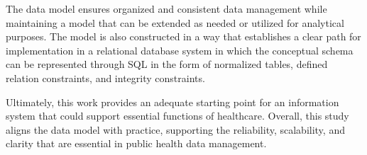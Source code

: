 \documentclass[a4paper,12pt]{article}
\begin{document}
The data model ensures organized and consistent data management while maintaining a model that can be extended as needed or utilized for analytical purposes. The model is also constructed in a way that establishes a clear path for implementation in a relational database system in which the conceptual schema can be represented through SQL in the form of normalized tables, defined relation constraints, and integrity constraints. 

Ultimately, this work provides an adequate starting point for an information system that could support essential functions of healthcare. Overall, this study aligns the data model with practice, supporting the reliability, scalability, and clarity that are essential in public health data management.
\end{document}
